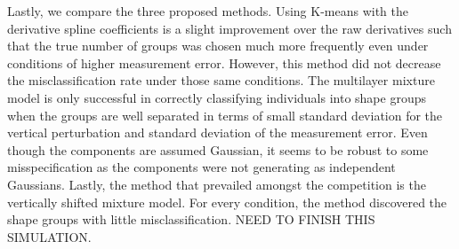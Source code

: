 \documentclass[12pt]{article}
\begin{document}
Lastly, we compare the three proposed methods. Using K-means with the derivative spline coefficients is a slight improvement over the raw derivatives such that the true number of groups was chosen much more frequently even under conditions of higher measurement error. However, this method did not decrease the misclassification rate under those same conditions. The multilayer mixture model is only successful in correctly classifying individuals into shape groups when the groups are well separated in terms of small standard deviation for the vertical perturbation and standard deviation of the measurement error. Even though the components are assumed Gaussian, it seems to be robust to some misspecification as the components were not generating as independent Gaussians. Lastly, the method that prevailed amongst the competition is the vertically shifted mixture model. For every condition, the method discovered the shape groups with little misclassification. NEED TO FINISH THIS SIMULATION.
\end{document}
